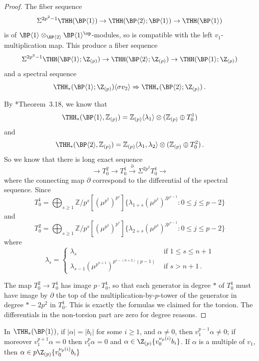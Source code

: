 \begin{proof}
  The fiber sequence 
  \[ 
    \Sigma^{2p^2-1}\THH(\BP\langle 1\rangle)\to \THH(\BP\langle 2\rangle ;\BP\langle 1\rangle)\to \THH(\BP\langle 1\rangle)
  \]
  is of $\BP\langle 1\rangle \otimes_{\BP \langle 2 \rangle} \BP\langle 1\rangle^\op$-modules, so is compatible with the left $v_1$-multiplication map. This produce a fiber sequence
  \[
    \Sigma^{2p^2-1}\THH(\BP\langle 1\rangle; \Z_{(p)})\to \THH(\BP\langle 2\rangle ; \Z_{(p)})\to \THH(\BP\langle 1\rangle; \Z_{(p)})
  \]
  and a spectral sequence
  \[
    \THH_*(\BP\langle 1\rangle; \Z_{(p)}) \langle \sigma v_2 \rangle \Rightarrow \THH_*(\BP \langle 2 \rangle; \Z_{(p)}) \,.
  \]

  By \cite{ACH24}*{Theorem~3.18}, we know that 
  \[
    \THH_*(\BP\langle 1\rangle,\mathbb{Z}_{(p)})=\mathbb{Z}_{(p)}\langle \lambda_1\rangle \otimes (\mathbb{Z}_{(p)}\oplus T_0^1)
  \]
  and 
  \[
    \THH_*(\BP\langle 2\rangle,\mathbb{Z}_{(p)})=\mathbb{Z}_{(p)}\langle \lambda_1,\lambda_2\rangle \otimes (\mathbb{Z}_{(p)}\oplus T_0^2)\,.
  \]
  So we know that there is long exact sequence 
  \[ 
    \to T_0^{2} \to T_0^1\overset{\partial}{\to} \Sigma^{2p^2}T_0^1 \to 
  \]
  where the connecting map $\partial$ correspond to the differential of the spectral sequence.
  Since 
  \[ 
    T_0^1=\bigoplus_{s\ge 1}\mathbb{Z}/p^s[(\mu^{p^2})^{p^s}]\{\lambda_{1+s}(\mu^{p^2})^{jp^{s-1}}: 0\le j\le p-2\}
  \]
  and 
  \[ 
    T_0^2=\bigoplus_{s\ge 1}\mathbb{Z}/p^s[(\mu^{p^3})^{p^s}]\{\lambda_{2+s}(\mu^{p^3})^{jp^{s-1}}: 0\le j\le p-2\}
  \]
  where 
  \[ 
    \lambda_{s}=\begin{cases} \lambda_s & \text{ if } 1\le s\le n+1  \\ 
      \lambda_{s-1}(\mu^{p^{n+1}})^{p^{s-(n+2)}(p-1)} & \text{ if } s>n+1 \,.
    \end{cases}
  \]
  
  The map $T_0^2 \rightarrow T_0^1$ has image $p \cdot T_0^1$, so that each generator in degree $*$ of $T_0^1$ must have image by $\partial$ the top of the multiplication-by-$p$-tower of the generator in degree $*-2p^2$ in $T_0^1$. This is exactly the formulas we claimed for the torsion. The differentials in the non-torsion part are zero for degree reasons.
\end{proof}

\begin{lemma} \label{lem:thhell1}
  In $\THH_*(\BP\langle 1\rangle)$, if $|\alpha| = |b_i|$ for some $i \geq 1$, and $\alpha \neq 0$, then $v_1^{p-1} \alpha \neq 0$; if moreover $v_1^{p+1} \alpha = 0$ then $v_1^p \alpha = 0$ and $\alpha \in \Z_{(p)} \{ v_0^{\nu_p(i)}b_i \}$. If $\alpha$ is a multiple of $v_1$, then $\alpha \in p\Z_{(p)} \{ v_0^{\nu_p(i)}b_i \}$ 
\end{lemma}

